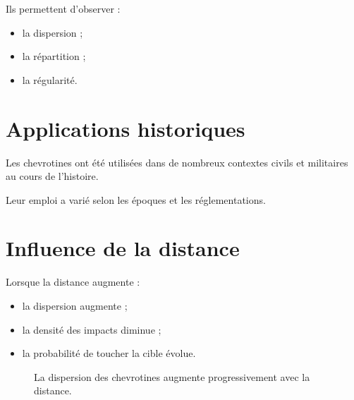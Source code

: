 Ils permettent d'observer :

\begin{itemize}
    \item la dispersion ;
    \item la répartition ;
    \item la régularité.
\end{itemize}

\section{Applications historiques}

Les chevrotines ont été utilisées dans de nombreux contextes civils et
militaires au cours de l'histoire.

Leur emploi a varié selon les époques et les réglementations.

\section{Influence de la distance}

Lorsque la distance augmente :

\begin{itemize}
    \item la dispersion augmente ;
    \item la densité des impacts diminue ;
    \item la probabilité de toucher la cible évolue.
\end{itemize}

\begin{figure}[htbp]
\centering


\caption{La dispersion des chevrotines augmente progressivement avec la distance.}
\label{fig:dispersion_chevrotine}

\end{figure}

